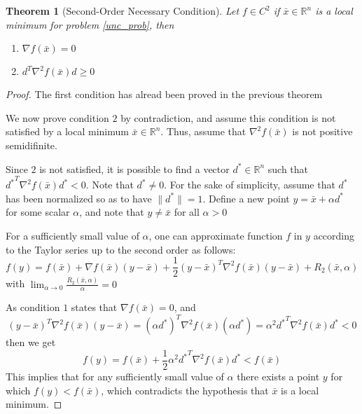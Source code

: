 \documentclass{book}
\newcommand{\R}{\mathbb{R}}
\theoremstyle{theoremv2}
\newtheorem{theorem}{Theorem}[chapter]
\theoremstyle{defv2}
\theoremstyle{remark}
\theoremstyle{remark}
\begin{document}
\begin{theorem}[Second-Order Necessary Condition]
    Let $f\in C^2$ if $\bar{x}\in\R^n$ is a local minimum for problem \eqref{unc_prob}, then 
    \begin{enumerate}
        \item $\nabla f(\bar{x})=0$ 
        \item $d^T \nabla^2f(\bar{x}) d \geq 0 $
    \end{enumerate}
\end{theorem}
\begin{proof}
    The first condition has alread been proved in the previous theorem 

    We now prove condition $2$ by contradiction, and assume this condition is not satisfied by a local minimum $\bar{x}\in\R^n$. Thus, assume that $\nabla^2 f(\bar{x})$ is not positive semidifinite. 

    Since $2$ is not satisfied, it is possible to find a vector $d^*\in\R^n$ such that ${d^*}^T\nabla^2 f(\bar{x})d^* < 0$. Note that $d^*\neq0$. For the sake of simplicity, assume that $d^*$ has been normalized so as to have $\|d^*\|=1$. Define a new point $y=\bar{x}+\alpha d^*$ for some scalar $\alpha$, and note that $y\neq \bar{x}$ for all $\alpha>0$

    For a sufficiently small value of $\alpha$, one can approximate function $f$ in $y$ according to the Taylor series up to the second order as follows: 
    \[
        f(y) = f(\bar{x}) + \nabla f(\bar{x})(y-\bar{x})+\frac{1}{2}(y-\bar{x})^T \nabla^2 f(\bar{x})(y-\bar{x}) + R_2(\bar{x},\alpha)
    \]
    with $\lim_{\alpha\to 0} \displaystyle\frac{R_2(\bar{x},\alpha)}{\alpha}=0$

    As condition $1$ states that $\nabla f(\bar{x})=0$, and
    \[
        (y-\bar{x})^T\nabla^2 f(\bar{x})(y-\bar{x}) = (\alpha d^*)^T \nabla^2 f(\bar{x}) (\alpha d^*) = \alpha^2 {d^*}^T \nabla^2 f(\bar{x}) d^* < 0
    \]
    then we get 
    \[
        f(y) = f(\bar{x}) + \frac{1}{2}  \alpha^2 {d^*}^T \nabla^2 f(\bar{x}) d^* < f(\bar{x})
    \]
    This implies that for any sufficiently small value of $\alpha$ there exists a point $y$ for which $f(y)<f(\bar{x})$, which contradicts the hypothesis that $\bar{x}$ is a local minimum.
\end{proof}
\end{document}
